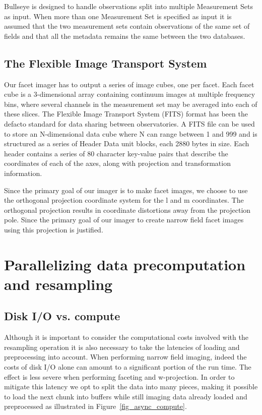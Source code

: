 Bullseye is designed to handle observations split into multiple Measurement Sets as input. When more than one Measurement Set is specified as input it is assumed that
the two measurement sets contain observations of the same set of fields and that all the metadata remains the same between the two databases.

\subsection{The Flexible Image Transport System}
Our facet imager has to output a series of image cubes, one per facet. Each facet cube is a 3-dimensional array containing continuum images at multiple 
frequency bins, where several channels in the measurement set may be averaged into each of these slices. The Flexible Image Transport System (FITS) \cite{pence2010definition} 
format has been the defacto standard for data sharing between observatories. A FITS file can be used to store an N-dimensional data cube where N can range between 1 and 999 and is
structured as a series of Header Data unit blocks, each 2880 bytes in size. Each header contains a series of 80 character key-value pairs that 
describe the coordinates of each of the axes, along with projection and transformation information.

Since the primary goal of our imager is to make facet images, we choose to use the orthogonal projection coordinate system for the l and m coordinates. The orthogonal
projection results in coordinate distortions away from the projection pole. Since the primary goal of our imager to create narrow field facet images using this projection is
justified.

\section{Parallelizing data precomputation and resampling}
\subsection{Disk I/O vs. compute}
Although it is important to consider the computational costs involved with the resampling operation it is also necessary to take the latencies of loading
and preprocessing into account. When performing narrow field imaging, indeed the costs of disk I/O alone can amount to a significant portion of the run time.
The effect is less severe when performing faceting and w-projection. In order to mitigate this latency we opt to split the data into many pieces, making it possible
to load the next chunk into buffers while still imaging data already loaded and preprocessed as illustrated in Figure~\ref{fig_async_compute}.

